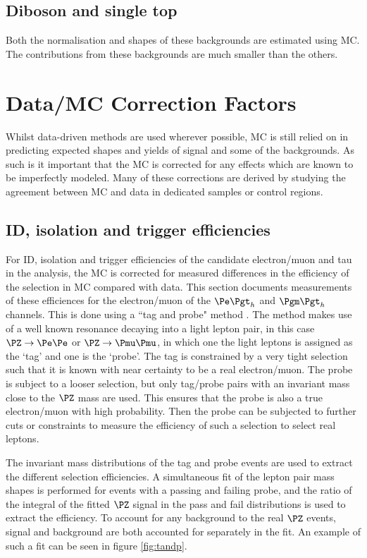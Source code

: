 \subsection{Diboson and single top}
Both the normalisation and shapes of these backgrounds are estimated using MC.
The contributions from these backgrounds are much smaller than the others.

\section{Data/MC Correction Factors}
\label{sec:datamcfactors}

Whilst data-driven methods are used wherever possible, \ac{MC} is still
relied on in predicting expected shapes and yields of signal and some of the
backgrounds. As such is it important that the \ac{MC} is corrected for
any effects which are known to be imperfectly modeled. Many of these corrections
are derived by studying the agreement between \ac{MC} and data in dedicated
samples or control regions.

\subsection{ID, isolation and trigger efficiencies}
\label{sec:idisotrigger}

For ID, isolation and trigger efficiencies of the candidate electron/muon 
and tau in the analysis, the \ac{MC} is corrected for measured differences in 
the efficiency of the selection in \ac{MC} compared with data. 
This section documents measurements of these efficiences for the electron/muon 
of the $\etau$ and $\mutau$ channels. This is done using a ``tag and probe"
method \cite{Khachatryan:2010xn}.
The method makes use of a well known resonance decaying
into a light lepton pair, in this case $\PZ\to\Pe\Pe$ or $\PZ\to\Pmu\Pmu$, 
in which one the light leptons is assigned as the `tag' and one is the `probe'. 
The tag is constrained by a very tight selection such that it is known with near 
certainty to be a real electron/muon. The probe is subject to a looser selection, 
but only tag/probe pairs with an invariant mass close to the $\PZ$ mass are used. 
This ensures that the probe is also a true electron/muon with high probability. 
Then the probe can be subjected to further cuts or constraints to measure the 
efficiency of such a selection to select real leptons.

The invariant mass distributions of the tag and probe events are used to extract
the different selection efficiencies. A simultaneous fit of the lepton pair mass
shapes is performed for events with a passing and failing probe, 
and the ratio of the integral of the fitted $\PZ$ signal 
in the pass and fail distributions is used to extract the efficiency. To account for any background
to the real $\PZ$ events, signal and background are both accounted for
separately in the fit. An example of such a fit can be seen in figure
\ref{fig:tandp}.

